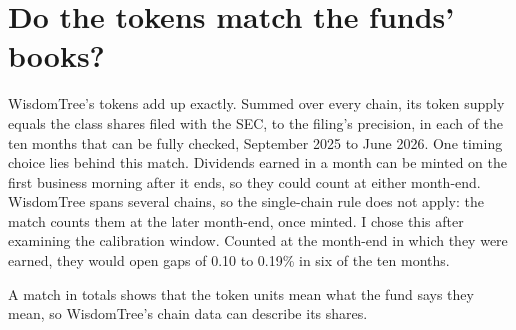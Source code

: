 \documentclass[12pt,a4paper]{article}
\begin{document}

\section{Do the tokens match the funds' books?}\label{sec:m0}
WisdomTree's tokens add up exactly. Summed over every chain, its token supply equals the class shares filed with the SEC, to the filing's precision, in each of the ten months that can be fully checked, September 2025 to June 2026. One timing choice lies behind this match. Dividends earned in a month can be minted on the first business morning after it ends, so they could count at either month-end. WisdomTree spans several chains, so the single-chain rule does not apply: the match counts them at the later month-end, once minted. I chose this after examining the calibration window. Counted at the month-end in which they were earned, they would open gaps of 0.10 to 0.19\% in six of the ten months.

A match in totals shows that the token units mean what the fund says they mean, so WisdomTree's chain data can describe its shares.
\end{document}
